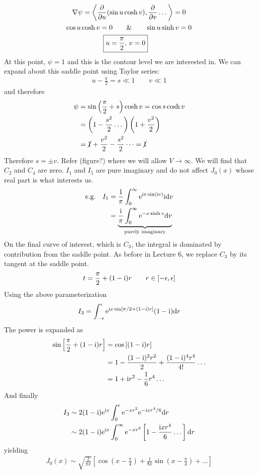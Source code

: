 \begin{gather*}
	\nabla \psi = \left\langle \frac{\partial}{\partial u}(\sin u \cosh v), \frac{\partial}{\partial v} \dots  \right\rangle = 0 \\
	\cos u \cosh v = 0 \qquad \& \qquad  \sin u \sinh v = 0 \\
	\boxed{u = \frac{\pi}{2}, \, v = 0}
 \quad 
\end{gather*}
At this point, $\psi = 1$ and this is the contour level we are interested in. We can expand about this saddle point using Taylor series:
\begin{align*}
	u - \frac{\pi}{2} = s \ll 1 \qquad v \ll 1
\end{align*}
and therefore
\begin{align*}
	\psi &= \sin\left(\frac{\pi}{2}+s\right) \cosh v = \cos s \cosh v \\
	&= \left(1- \frac{s^2}{2} \dots\right) \left(1+ \frac{v^2}{2}\right) \\
	& = \cancel{1} + \frac{v^2}{2} - \frac{s^2}{2} \dots = \cancel{1}
\end{align*}
Therefore $s = \pm v$. Refer (figure?) where we will allow $V \rightarrow \infty$. We will find that $C_2$ and $C_4$ are zero. $I_1$ and $I_5$ are pure imaginary and do not affect $J_0(x)$ whose real part is what interests us.
\begin{align*}
	\text{e.g.} \quad I_1 &= \frac{1}{\pi} \int_{0}^{\infty} \mathrm{e}^{\mathrm{i} x \sin (\mathrm{i} v)} \mathrm{i} \mathrm{d} v \\
	&= \underbrace{\frac{\mathrm{i}}{\pi} \int_{0}^{\infty} \mathrm{e}^{-x \sinh v }\mathrm{d} v}_\text{purely imaginary}
\end{align*}
On the final curve of interest, which is $C_3$, the integral is dominated by contribution from the saddle point. As before in Lecture 6, we replace $C_3$ by its tangent at the saddle point. 
\begin{gather*}
	t = \frac{\pi}{2} + (1-\mathrm{i} )r \qquad r \in [-\epsilon,\epsilon]
\end{gather*}
Using the above parameterization
\begin{align*}
	I_3 = \int_{-\epsilon}^{\epsilon} \mathrm{e}^{\mathrm{i} x \sin \left[{\pi}/{2} + (1-\mathrm{i} )r\right]} (1-\mathrm{i}) \mathrm{d} r
\end{align*}
The power is expanded as
\begin{align*}
	\sin \left[\frac{\pi}{2} + (1-\mathrm{i})r\right] &= \cos \left[(1-\mathrm{i})r\right] \\
	&= 1 - \frac{(1-\mathrm{i})^2 r^2}{2} + \frac{(1-\mathrm{i})^4 r^4}{4!} \dots \\
	& = 1 + \mathrm{i} r^2 - \frac{1}{6} r^4 \dots 
\end{align*}
And finally
\begin{align*}
	I_3 & \sim 2(1-\mathrm{i} )\mathrm{e}^{\mathrm{i} x}\int_{0}^{\epsilon} \mathrm{e}^{-xr^2} \mathrm{e}^{-\mathrm{i} x r^4/6} \mathrm{d} r \\
	& \sim 2(1-\mathrm{i} )\mathrm{e}^{\mathrm{i} x}\int_{0}^{\infty} \mathrm{e}^{-xr^2} \left[1 - \frac{\mathrm{i} x r^4}{6} \dots \right] \mathrm{d} r \\
\end{align*}
yielding
\begin{align*}
	J_0(x) \sim  \sqrt{\frac{2}{\pi x}} \left[\cos\left(x-\frac{\pi}{4}\right) + \frac{1}{8x} \sin\left(x-\frac{\pi}{4}\right) + ...\right]
\end{align*}
